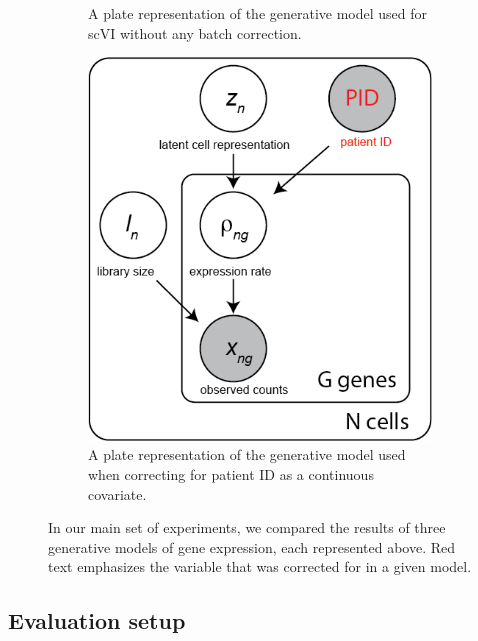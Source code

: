 \documentclass{article}
\begin{document}
\begin{figure}[h]
\begin{subfigure}[b]{0.3\textwidth}
         \caption{A plate representation of the generative model used for scVI without any batch correction.}
         \label{fig:vanilla_scvi}
     \end{subfigure}
          \hfill
     \begin{subfigure}[b]{0.3\textwidth}
         \centering
         \includegraphics[width=\textwidth]{figures/scvi_pid.png}
         \caption{A plate representation of the generative model used when correcting for patient ID as a continuous covariate.}
         \label{fig:scvi_pid}
     \end{subfigure}
        \caption{In our main set of experiments, we compared the results of three generative models of gene expression, each represented above. Red text emphasizes the variable that was corrected for in a given model.}
        \label{fig:gen_models}
\end{figure}



\subsection{Evaluation setup}
\end{document}
